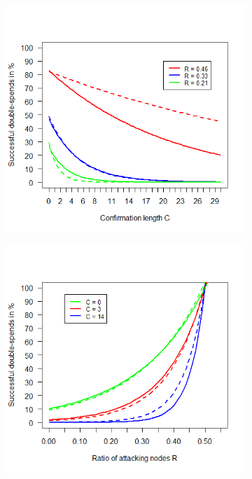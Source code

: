 \documentclass[a4paper,12pt,twoside]{report}
\begin{document}
\begin{figure}
\centering
\begin{subfigure}{.495\textwidth}
  \centering
  \includegraphics[width=\linewidth]{Comparison/Confirmations/conf.png}
\end{subfigure}
\begin{subfigure}{.495\textwidth}
  \centering
  \includegraphics[width=\linewidth]{Comparison/Confirmations/confrat.png}

\end{subfigure}
\end{figure}
\end{document}
